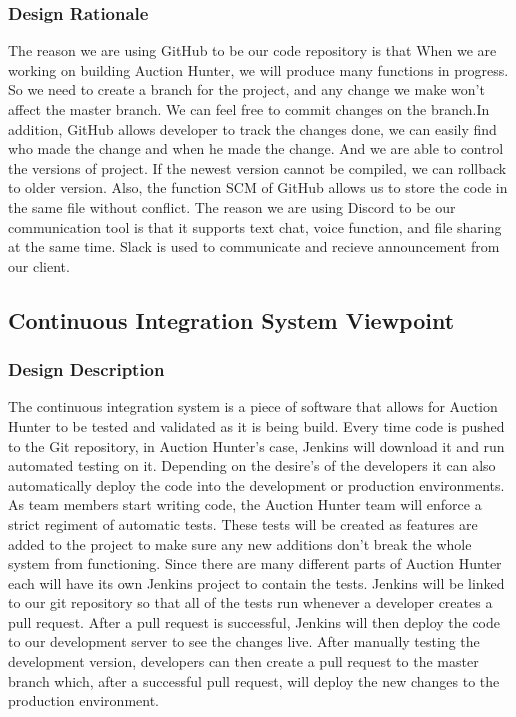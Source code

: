 \documentclass[onecolumn, draftclsnofoot, 10pt, compsoc]{IEEEtran}
\begin{document}
\subsubsection{Design Rationale}
The reason we are using GitHub to be our code repository is that When we are working on building Auction Hunter, we will produce many functions in progress. So we need to create a branch for the project, and any change we make won’t affect the master branch. We can feel free to commit changes on the branch.In addition, GitHub allows developer to track the changes done, we can easily find who made the change and when he made the change. And we are able to control the versions of project. If the newest version cannot be compiled, we can rollback to older version. Also, the function SCM of GitHub allows us to store the code in the same file without conflict.
The reason we are using Discord to be our communication tool is that it supports text chat, voice function, and file sharing at the same time. Slack is used to communicate and recieve announcement from our client.






\subsection{Continuous Integration System Viewpoint}
\subsubsection{Design Description}
The continuous integration system is a piece of software that allows for Auction Hunter to be tested and validated as it is being build. Every time code is pushed to the Git repository, in Auction Hunter's case, Jenkins will download it and run automated testing on it. Depending on the desire's of the developers it can also automatically deploy the code into the development or production environments. As team members start writing code, the Auction Hunter team will enforce a strict regiment of automatic tests. These tests will be created as features are added to the project to make sure any new additions don't break the whole system from functioning. Since there are many different parts of Auction Hunter each will have its own Jenkins project to contain the tests. Jenkins will be linked to our git repository so that all of the tests run whenever a developer creates a pull request. After a pull request is successful, Jenkins will then deploy the code to our development server to see the changes live. After manually testing the development version, developers can then create a pull request to the master branch which, after a successful pull request, will deploy the new changes to the production environment.
\end{document}
